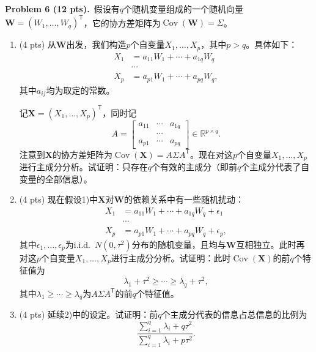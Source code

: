 \documentclass[UTF8,a4paper,11pt,fontset=fandol]{ctexart}
\newcommand{\problem}[2]{\par\addvspace{10pt}\Needspace{5\baselineskip}\textbf{Problem #1 (#2 pts).}\ }
\newcommand{\trans}{^{\mathsf T}}
\DeclareMathOperator{\Cov}{Cov}
\begin{document}
\newpage
\problem{6}{12}假设有$q$个随机变量组成的一个随机向量$\bm W=(W_1,\ldots,W_q)\trans$，它的协方差矩阵为$\Cov(\bm W)=\Sigma$。
\begin{enumerate}
  \item (4 pts) 从$\bm W$出发，我们构造$p$个自变量$X_1,\ldots,X_p$，其中$p>q$。具体如下：
  \begin{equation*}
    \begin{aligned}
      X_1&=a_{11}W_1+\cdots+a_{1q}W_q\\
      &\cdots\\
      X_p&=a_{p1}W_1+\cdots+a_{pq}W_q,
    \end{aligned}
  \end{equation*}
  其中$a_{ij}$均为取定的常数。

  记$\bm X=(X_1,\ldots,X_p)\trans$，同时记
  \begin{equation*}
    A=\begin{bmatrix}
      a_{11}&\cdots&a_{1q}\\
      &\cdots&\\
      a_{p1}&\cdots&a_{pq}
    \end{bmatrix}\in\mathbb R^{p\times q}.
  \end{equation*}
  注意到$\bm X$的协方差矩阵为$\Cov(\bm X)=A\Sigma A\trans$。现在对这$p$个自变量$X_1,\ldots,X_p$进行主成分分析。试证明：只存在$q$个有效的主成分（即前$q$个主成分代表了自变量的全部信息）。

  \item (4 pts) 现在假设1)中$\bm X$对$\bm W$的依赖关系中有一些随机扰动：
  \begin{equation*}
    \begin{aligned}
      X_1&=a_{11}W_1+\cdots+a_{1q}W_q+\epsilon_1\\
      &\cdots\\
      X_p&=a_{p1}W_1+\cdots+a_{pq}W_q+\epsilon_p,
    \end{aligned}
  \end{equation*}
  其中$\epsilon_1,\ldots,\epsilon_p$为i.i.d.\ $N(0,\tau^2)$分布的随机变量，且均与$\bm W$互相独立。此时再对这$p$个自变量$X_1,\ldots,X_p$进行主成分分析。试证明：此时$\Cov(\bm X)$的前$q$个特征值为
  \begin{equation*}
    \lambda_1+\tau^2\ge\cdots\ge\lambda_q+\tau^2,
  \end{equation*}
  其中$\lambda_1\ge\cdots\ge\lambda_q$为$A\Sigma A\trans$的前$q$个特征值。

  \item (4 pts) 延续2)中的设定。试证明：前$q$个主成分代表的信息占总信息的比例为
  \begin{equation*}
    \frac{\sum_{i=1}^q\lambda_i+q\tau^2}{\sum_{i=1}^q\lambda_i+p\tau^2}.
  \end{equation*}
\end{enumerate}
\end{document}
